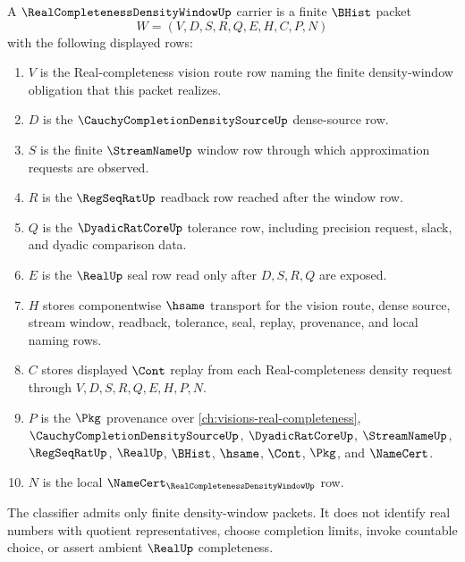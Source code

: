 \begin{definition}
\label{def:real-completeness-density-window-carrier}
A $\RealCompletenessDensityWindowUp$ carrier is a finite $\BHist$ packet
$$
W=(V,D,S,R,Q,E,H,C,P,N)
$$
with the following displayed rows:
\begin{enumerate}
\item $V$ is the Real-completeness vision route row naming the finite density-window obligation that this packet realizes.
\item $D$ is the $\CauchyCompletionDensitySourceUp$ dense-source row.
\item $S$ is the finite $\StreamNameUp$ window row through which approximation requests are observed.
\item $R$ is the $\RegSeqRatUp$ readback row reached after the window row.
\item $Q$ is the $\DyadicRatCoreUp$ tolerance row, including precision request, slack, and dyadic comparison data.
\item $E$ is the $\RealUp$ seal row read only after $D,S,R,Q$ are exposed.
\item $H$ stores componentwise $\hsame$ transport for the vision route, dense source, stream window, readback, tolerance, seal, replay, provenance, and local naming rows.
\item $C$ stores displayed $\Cont$ replay from each Real-completeness density request through $V,D,S,R,Q,E,H,P,N$.
\item $P$ is the $\Pkg$ provenance over \autoref{ch:visions-real-completeness}, $\CauchyCompletionDensitySourceUp$, $\DyadicRatCoreUp$, $\StreamNameUp$, $\RegSeqRatUp$, $\RealUp$, $\BHist$, $\hsame$, $\Cont$, $\Pkg$, and $\NameCert$.
\item $N$ is the local $\NameCert_{\RealCompletenessDensityWindowUp}$ row.
\end{enumerate}
The classifier admits only finite density-window packets. It does not identify real numbers with quotient representatives, choose completion limits, invoke countable choice, or assert ambient $\RealUp$ completeness.
\end{definition}

